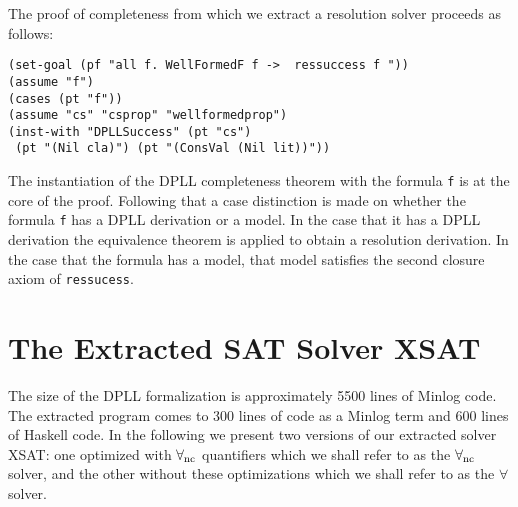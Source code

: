 The proof of completeness from which we extract a resolution solver proceeds as follows:

\begin{lstlisting}[caption = "Beginning of the Resolution Completeness Proof"]
(set-goal (pf "all f. WellFormedF f ->  ressuccess f "))
(assume "f")
(cases (pt "f"))
(assume "cs" "csprop" "wellformedprop")
(inst-with "DPLLSuccess" (pt "cs") 
 (pt "(Nil cla)") (pt "(ConsVal (Nil lit))"))
\end{lstlisting}

The instantiation of the DPLL completeness theorem with the formula  \texttt{f} is at the core of the proof. Following that a case distinction is made on whether the formula \texttt{f} has a DPLL derivation or a model. In the case that it has a DPLL derivation the equivalence theorem is applied to obtain a resolution derivation. In the case that the formula has a model, that model satisfies the second closure axiom of \texttt{ressucess}. 

\section{The Extracted SAT Solver XSAT}\label{chapter:dpllprogram} \label{section:dpllapp}
\label{sec:program}
The size of the DPLL formalization 
is approximately 5500  lines of Minlog code. The extracted program comes to 300 lines of code as a Minlog term and  600 lines of Haskell code. In the following we present two versions of our extracted solver XSAT: one optimized with $\forall_{\mathrm{nc}}$ quantifiers which we shall refer to as the $\forall_{\mathrm{nc}}$ solver, and the other without these optimizations which we shall refer to as the $\forall$ solver.
  
